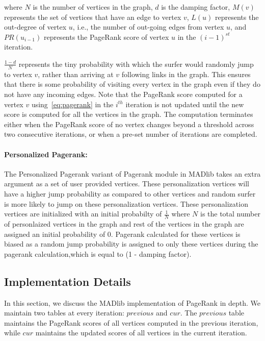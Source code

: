 where $N$ is the number of vertices in the graph, $d$ is the damping factor,
$M(v)$ represents the set of vertices that have an edge to vertex $v$,
$L(u)$ represents the out-degree of vertex $u$, i.e., the number of
out-going edges from vertex $u$, and $PR(u_{i-1})$ represents the PageRank
score of vertex $u$ in the $(i-1)^{st}$ iteration.

$\frac{1-d}{N}$ represents the tiny probability with which the surfer
would randomly jump to vertex $v$, rather than arriving at $v$ following
links in the graph. This ensures that there is some probability of visiting
every vertex in the graph even if they do not have any incoming edges. Note
that the PageRank score computed for a vertex $v$ using~\ref{eq:pagerank}
in the $i^{th}$ iteration is not updated until the new score is computed for
all the vertices in the graph. The computation terminates either when the
PageRank score of no vertex changes beyond a threshold across two consecutive
iterations, or when a pre-set number of iterations are completed.

\paragraph{Personalized Pagerank:}
The Personalized Pagerank variant of Pagerank module in MADlib takes an extra argument as a set of user provided vertices.
These personalization vertices will have a higher jump probability as compared to other vertices and random surfer is more likely to jump on these personalization vertices. These personalization vertices are initialized with an initial probabilty of $\frac{1}{N}$ where $N$ is the total number of personlaized vertices in the graph and rest of the vertices in the graph are assigned an initial probability of 0. Pagerank calculated for these vertices is biased as a random jump probability is assigned to only these vertices during the pagerank calculation,which is equal to (1 - damping factor).

\subsection{Implementation Details} \label{sec:pagerank:implementation}

In this section, we discuss the MADlib implementation of PageRank in depth.
We maintain two tables at every iteration: $previous$ and $cur$. The
$previous$ table maintains the PageRank scores of all vertices computed in
the previous iteration, while $cur$ maintains the updated scores of all
vertices in the current iteration.


